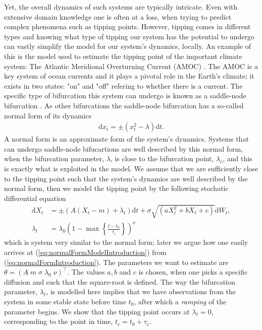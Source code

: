 Yet, the overall dynamics of such systems are typically intricate. Even with extensive domain knowledge one is often at a loss, when trying to predict complex phenomena such as tipping points. However, tipping comes in different types and knowing what type of tipping our system has the potential to undergo can vastly simplify the model for our system's dynamics, locally. An example of this is the model used to estimate the tipping point of the important climate system: The Atlantic Meridional Overturning Current (AMOC) \cite{Ditlevsen2023}. The AMOC is a key system of ocean currents and it plays a pivotal role in the Earth's climate; it exists in two states: "on" and "off" refering to whether there is a current. The specific type of bifurcation this system can undergo is known as a saddle-node bifurcation \cite{Ditlevsen2023}\cite{Strogatz2019_gv}. As other bifurcations the saddle-node bifurcation has a so-called normal form of its dynamics 
\begin{align}
    \mathrm{d}x_t = \pm\left(x_t^2 - \lambda\right)\mathrm{d}t. \label{eq:normalFormIntroduction}
\end{align}
A normal form is an approximate form of the system's dynamics. Systems that can undergo saddle-node bifucartions are well described by this normal form, when the bifurcation parameter, $\lambda$, is close to the bifurcation point, $\lambda_c$, and this is exactly what is exploited in the model. We assume that we are sufficiently close to the tipping point such that the system's dynamics are well described by the normal form, then we model the tipping point by the following stochatic differential equation
\begin{align}
    \mathrm{d}X_t &= \pm(A(X_t - m) + \lambda_t)\mathrm{d}t + \sigma\sqrt{\left(aX_t^2 + bX_t + c\right)}\mathrm{d}W_t, \label{eq:normalFormModelIntroduction}\\
    \lambda_t &= \lambda_0\left(1 - \max\left\{\frac{t - t_0}{\tau_c}\right\}\right)^\nu \label{eq:lambdaRampDefinitionIntroduction}
\end{align}
which is system very similar to the normal form; later we argue how one easily arrives at (\ref{eq:normalFormModelIntroduction}) from (\ref{eq:normalFormIntroduction}). The parameters we want to estimate are $\theta = \left(A\; m\; \sigma\; \lambda_0\; \nu\right)^\top$. The values $a, b$ and $c$ is chosen, when one picks a specific diffusion and such that the square-root is defined. The way the bifurcation parameter, $\lambda_t$, is modelled here implies that we have observations from the system in some stable state before time $t_0$, after which a \textit{ramping} of the parameter begins. We show that the tipping point occurs at $\lambda_t = 0$, corresponding to the point in time, $t_c = t_0 + \tau_c$.

